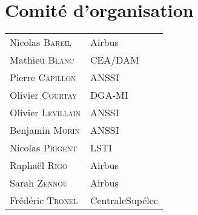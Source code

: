 \section*{Comit\'e d'organisation}
\begin{tabular}{@{}p{5cm}@{}p{6.5cm}@{}}
  Nicolas  \textsc{Bareil}        & Airbus              \\
  Mathieu  \textsc{Blanc}         & CEA/DAM             \\
  Pierre   \textsc{Capillon}      & ANSSI               \\
  Olivier  \textsc{Courtay}       & DGA-MI              \\
  Olivier  \textsc{Levillain}     & ANSSI               \\
  Benjamin \textsc{Morin}         & ANSSI               \\
  Nicolas  \textsc{Prigent}       & LSTI                \\
  Raphaël  \textsc{Rigo}          & Airbus              \\
  Sarah  \textsc{Zennou}          & Airbus              \\
  Frédéric  \textsc{Tronel}   & CentraleSupélec         \\
\end{tabular}

